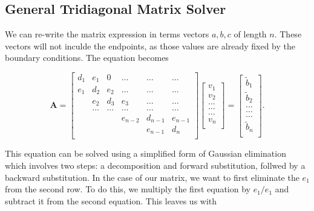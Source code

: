 \documentclass[%
oneside,                 %
final,                   %
10pt]{article}
\begin{document}
\subsection{General Tridiagonal Matrix Solver}

We can re-write the matrix expression in terms vectors $a,b,c$ of length $n$.  These vectors will not inculde the endpoints, as those values are already fixed by the boundary conditions. The equation becomes

\[
    \mathbf{A} = \begin{bmatrix}
                           d_1& e_1 & 0 &\dots   & \dots &\dots \\
                           e_1 & d_2 & e_2 &\dots &\dots &\dots \\
                           & e_2 & d_3 & e_3 & \dots & \dots \\
                           & \dots   & \dots &\dots   &\dots & \dots \\
                           &   &  &e_{n-2}  &d_{n-1}& e_{n-1} \\
                           &    &  &   &e_{n-1} & d_n \\
                      \end{bmatrix}\begin{bmatrix}
                           v_1\\
                           v_2\\
                           \dots \\
                          \dots  \\
                          \dots \\
                           v_n\\
                      \end{bmatrix}
  =\begin{bmatrix}
                           \tilde{b}_1\\
                           \tilde{b}_2\\
                           \dots \\
                           \dots \\
                          \dots \\
                           \tilde{b}_n\\
                      \end{bmatrix}.
\]

This equation can be solved using a simplified form of Gaussian elimination which involves two steps: a decomposition and forward substitution, follwed by a backward substitution.  In the case of our matrix, we want to first eliminate the $e_1$ from the second row.  To do this, we multiply the first equation by $e_1/e_1$ and subtract it from the second equation.  This leaves us with
\end{document}
